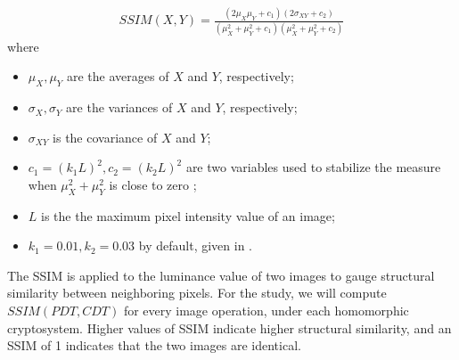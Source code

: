 \begin{description}
\begin{align}
		SSIM(X,Y) = \frac{(2\mu_X\mu_Y+c_1)(2\sigma_{XY}+c_2)}{(\mu_X^2+\mu_Y^2+c_1)(\mu_X^2+\mu_Y^2+c_2)}
	\end{align}
	where
	\begin{itemize}
		\item $\mu_X, \mu_Y$ are the averages of $X$ and $Y$, respectively;
		\item $\sigma_X, \sigma_Y$ are the variances of $X$ and $Y$, respectively;
		\item $\sigma_{XY}$ is the covariance of $X$ and $Y$;
		\item $c_1 = (k_1L)^2, c_2 = (k_2L)^2$ are two variables used to stabilize the measure when $\mu_X^2+\mu_Y^2$ is close to zero \cite{akramullah_video_2014};
		\item $L$ is the the maximum pixel intensity value of an image;
		\item $k_1 = 0.01, k_2 = 0.03$ by default, given in \cite{ahmed_benchmark_2016}.
	\end{itemize}
	The SSIM is applied to the luminance value of two images to gauge structural similarity between neighboring pixels.
	For the study, we will compute $SSIM(PDT, CDT)$ for every image operation, under each homomorphic cryptosystem. Higher values of SSIM indicate higher structural similarity, and an SSIM of 1 indicates that the two images are identical\cite{ahmed_benchmark_2016}.
\end{description}

